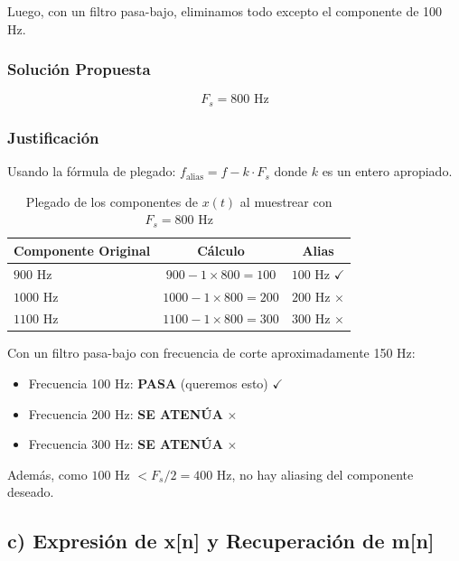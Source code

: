 \documentclass[12pt]{article}
\begin{document}
Luego, con un filtro pasa-bajo, eliminamos todo excepto el componente de 100 Hz.

\subsubsection*{Solución Propuesta}

\begin{equation}
\boxed{F_s = 800 \text{ Hz}}
\end{equation}

\subsubsection*{Justificación}

Usando la fórmula de plegado: $f_{\text{alias}} = f - k \cdot F_s$ donde $k$ es un entero apropiado.

\begin{table}[H]
\centering
\begin{tabular}{lcc}
\toprule
\textbf{Componente Original} & \textbf{Cálculo} & \textbf{Alias} \\
\midrule
$900$ Hz & $900 - 1 \times 800 = 100$ & $100$ Hz $\checkmark$ \\
$1000$ Hz & $1000 - 1 \times 800 = 200$ & $200$ Hz $\times$ \\
$1100$ Hz & $1100 - 1 \times 800 = 300$ & $300$ Hz $\times$ \\
\bottomrule
\end{tabular}
\caption{Plegado de los componentes de $x(t)$ al muestrear con $F_s = 800$ Hz}
\end{table}

Con un filtro pasa-bajo con frecuencia de corte aproximadamente 150 Hz:
\begin{itemize}
\item Frecuencia 100 Hz: \textbf{PASA} (queremos esto) $\checkmark$
\item Frecuencia 200 Hz: \textbf{SE ATENÚA} $\times$
\item Frecuencia 300 Hz: \textbf{SE ATENÚA} $\times$
\end{itemize}

Además, como $100$ Hz $< F_s/2 = 400$ Hz, no hay aliasing del componente deseado.

\subsection*{c) Expresión de x[n] y Recuperación de m[n]}
\end{document}

